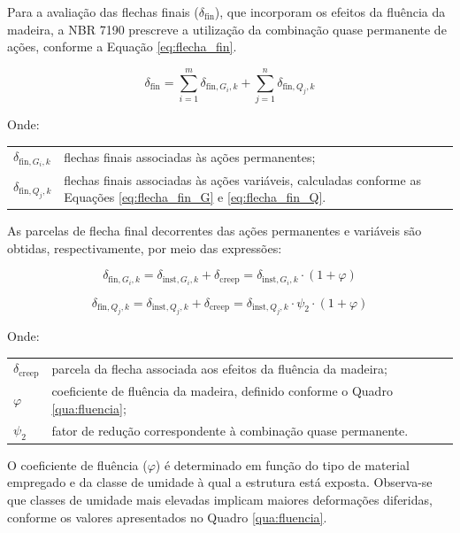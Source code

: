 Para a avaliação das flechas finais ($\delta_{\mathrm{fin}}$), que incorporam os efeitos da fluência da madeira, a NBR 7190 \parencite{NBR7190-1:2022} prescreve a utilização da combinação quase permanente de ações, conforme a Equação \eqref{eq:flecha_fin}.

\begin{equation}
\delta_{\mathrm{fin}} =
\sum_{i=1}^{m} \delta_{\mathrm{fin},G_i,k}
+ \sum_{j=1}^{n} \delta_{\mathrm{fin},Q_j,k}
\label{eq:flecha_fin}
\end{equation}

Onde:

\begin{tabular}{ll}
$\delta_{\mathrm{fin},G_i,k}$ & flechas finais associadas às ações permanentes; \\
$\delta_{\mathrm{fin},Q_j,k}$ & flechas finais associadas às ações variáveis, calculadas conforme as Equações \eqref{eq:flecha_fin_G} e \eqref{eq:flecha_fin_Q}.
\end{tabular}

As parcelas de flecha final decorrentes das ações permanentes e variáveis são obtidas, respectivamente, por meio das expressões:

\begin{equation}
\delta_{\mathrm{fin},G_i,k}
=
\delta_{\mathrm{inst},G_i,k}
+ \delta_{\mathrm{creep}}
=
\delta_{\mathrm{inst},G_i,k} \cdot (1 + \varphi)
\label{eq:flecha_fin_G}
\end{equation}

\begin{equation}
\delta_{\mathrm{fin},Q_j,k}
=
\delta_{\mathrm{inst},Q_j,k}
+ \delta_{\mathrm{creep}}
=
\delta_{\mathrm{inst},Q_j,k} \cdot \psi_{2} \cdot (1 + \varphi)
\label{eq:flecha_fin_Q}
\end{equation}

Onde:

\begin{tabular}{ll}
$\delta_{\mathrm{creep}}$ & parcela da flecha associada aos efeitos da fluência da madeira; \\
$\varphi$ & coeficiente de fluência da madeira, definido conforme o Quadro \ref{qua:fluencia}; \\
$\psi_{2}$ & fator de redução correspondente à combinação quase permanente.
\end{tabular}

O coeficiente de fluência ($\varphi$) é determinado em função do tipo de material empregado e da classe de umidade à qual a estrutura está exposta. Observa-se que classes de umidade mais elevadas implicam maiores deformações diferidas, conforme os valores apresentados no Quadro \ref{qua:fluencia}.

